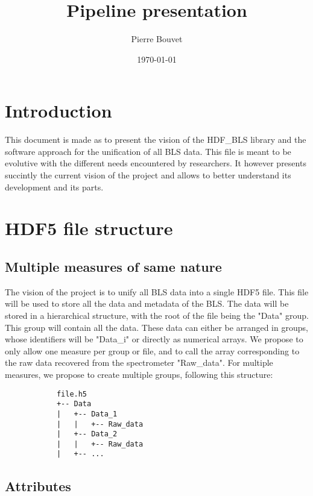 \documentclass{article}
\title{Pipeline presentation}
\author{Pierre Bouvet}
\date{\today}
\begin{document}
\maketitle


\section{Introduction}
This document is made as to present the vision of the HDF\_BLS library and the software approach for the unification of all BLS data. This file is meant to be evolutive with the different needs encountered by researchers. It however presents succintly the current vision of the project and allows to better understand its development and its parts.

\section{HDF5 file structure}

    \subsection{Multiple measures of same nature}
        The vision of the project is to unify all BLS data into a single HDF5 file. This file will be used to store all the data and metadata of the BLS. The data will be stored in a hierarchical structure, with the root of the file being the "Data" group. This group will contain all the data. These data can either be arranged in groups, whose identifiers will be "Data\_i" or directly as numerical arrays. We propose to only allow one measure per group or file, and to call the array corresponding to the raw data recovered from the spectrometer "Raw\_data". For multiple measures, we propose to create multiple groups, following this structure:

        \begin{verbatim}
            file.h5
            +-- Data
            |   +-- Data_1
            |   |   +-- Raw_data
            |   +-- Data_2
            |   |   +-- Raw_data
            |   +-- ...
        \end{verbatim}

    \subsection{Attributes}
\end{document}
